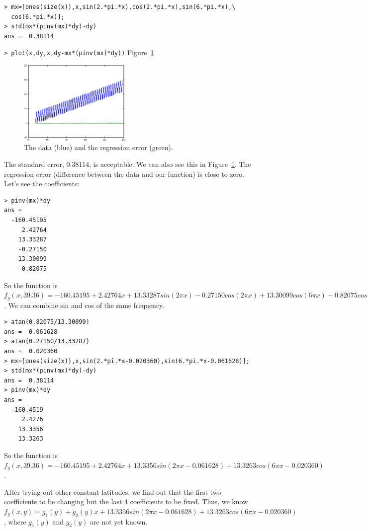 \documentclass[a4paper]{article}
\begin{document}
\begin{verbatim}
> mx=[ones(size(x)),x,sin(2.*pi.*x),cos(2.*pi.*x),sin(6.*pi.*x),\
  cos(6.*pi.*x)];
> std(mx*(pinv(mx)*dy)-dy)
ans =  0.38114
\end{verbatim}
\verb|> plot(x,dy,x,dy-mx*(pinv(mx)*dy))| \hfill Figure~\ref{fig:fyx-lc}

\begin{figure}[htb]
\begin{center}
\includegraphics[width=0.48\textwidth]{fyx-lc.png}
\end{center}
\caption{The data (blue) and the regression error (green).}
\label{fig:fyx-lc}
\end{figure}
The standard error, 0.38114, is acceptable.
We can also see this in Figure~\ref{fig:fyx-lc}.
The regression error (difference between the data and our function) is close
to zero.
Let's see the coefficients:

\begin{verbatim}
> pinv(mx)*dy
ans =
  -160.45195
     2.42764
    13.33287
    -0.27150
    13.30099
    -0.82075
\end{verbatim}

So the function is $f_y(x,39.36)=-160.45195+2.42764x+13.33287sin(2\pi
x)-0.27150cos(2\pi x)+13.30099cos(6\pi x)-0.82075cos(6\pi x)$.
We can combine sin and cos of the same frequency.

\begin{verbatim}
> atan(0.82075/13.30099)
ans =  0.061628
> atan(0.27150/13.33287)
ans =  0.020360
> mx=[ones(size(x)),x,sin(2.*pi.*x-0.020360),sin(6.*pi.*x-0.061628)];
> std(mx*(pinv(mx)*dy)-dy)
ans =  0.38114
> pinv(mx)*dy
ans =
  -160.4519
     2.4276
    13.3356
    13.3263
\end{verbatim}
So the function is $f_y(x,39.36)=-160.45195+2.42764x+13.3356sin(2\pi
x-0.061628)+13.3263cos(6\pi x-0.020360)$.

After trying out other constant latitudes, we find out that the first two
coefficients to be changing but the last 4 coefficients to be fixed.
Thus, we know
$f_y(x,y)=g_1(y)+g_2(y)x+13.3356sin(2\pi x-0.061628)+13.3263cos(6\pi
x-0.020360)$, where $g_1(y)$ and $g_2(y)$ are not yet known.
\end{document}
